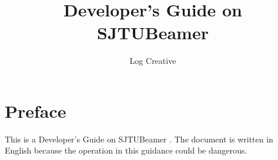\documentclass[]{article}
\title{Developer's Guide on\\ \textsf{SJTUBeamer} \fbox{\textsc{min}}}
\author{Log Creative}
\begin{document}
    \maketitle
    \tableofcontents
    \section{Preface}
    This is a Developer's Guide on \textsf{SJTUBeamer}  . The document is written in English because the operation in this guidance could be dangerous. 

    
\end{document}
